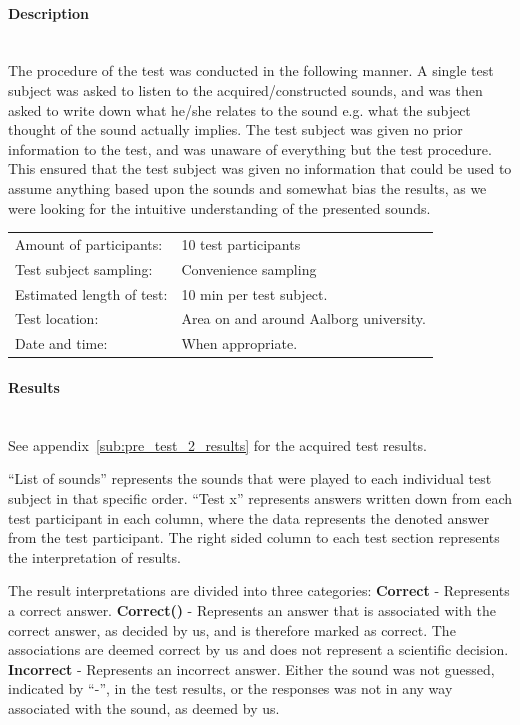 \paragraph{Description} %
\label{par:pre_test_2_description}
\hspace{0pt} \\
The procedure of the test was conducted in the following manner. 
A single test subject was asked to listen to the acquired/constructed sounds, and was then asked to write down what he/she relates to the sound e.g. what the subject thought of the sound actually implies. 
The test subject was given no prior information to the test, and was unaware of everything but the test procedure.
This ensured that the test subject was given no information that could be used to assume anything based upon the sounds and somewhat bias the results, as we were looking for the intuitive understanding of the presented sounds.

\begin{tabular}{l l}
Amount of participants: & 10 test participants \\
Test subject sampling: & Convenience sampling \\
Estimated length of test: & 10 min per test subject. \\
Test location: & Area on and around Aalborg university. \\
Date and time: & When appropriate.
\end{tabular}


\paragraph{Results} %
\label{par:pre_test_2_results}
\hspace{0pt} \\
See appendix~\ref{sub:pre_test_2_results} for the acquired test results.

\enquote{List of sounds} represents the sounds that were played to each individual test subject in that specific order.
\enquote{Test x} represents answers written down from each test participant in each column, where the data represents the denoted answer from the test participant.
The right sided column to each test section represents the interpretation of results.

The result interpretations are divided into three categories: \newline
\textbf{Correct} - Represents a correct answer. \newline
\textbf{Correct()} - Represents an answer that is associated with the correct answer, as decided by us, and is therefore marked as correct. 
The associations are deemed correct by us and does not represent a scientific decision. \newline
\textbf{Incorrect} - Represents an incorrect answer. 
Either the sound was not guessed, indicated by \enquote{-}, in the test results, or the responses was not in any way associated with the sound, as deemed by us.

